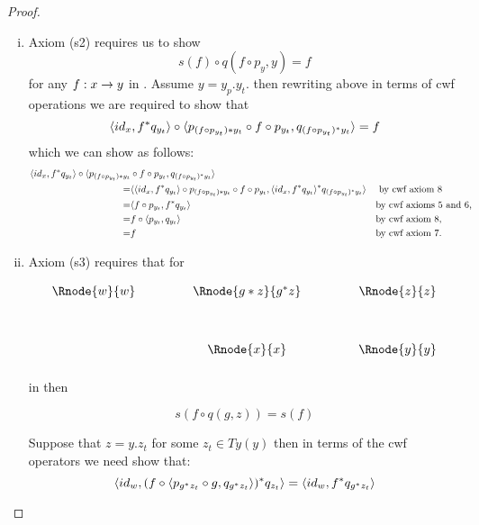 \begin{proof}
\begin{enumerate}[(i)]
\item Axiom (s2) requires us to show 
\begin{equation}
s(f) \circ q( f \circ p_y     ,y)=f
\end{equation}
for any $f:x \rightarrow y$  in \catc.
Assume 
 $y=y_p.y_t$.
then rewriting above in terms of cwf operations we are required to show that 
\begin{equation}
\langle id_x,f^*q_{y_t}\rangle\circ \langle p_{(f \circ p_{y_t})*y_t}\circ f \circ p_{y_t},
                                    q_{(f \circ p_{y_t})^*y_t}
																		\rangle = f
\end{equation}
which we can show as follows:
\begin{align*}
\langle id_x,f^*q_{y_t}\rangle\circ \langle p_{(f \circ p_{y_t})*y_t}&\circ f \circ p_{y_t}, q_{(f \circ p_{y_t})^*y_t}\rangle \\
=& \langle\langle id_x,f^*q_{y_t}\rangle \circ p_{(f \circ p_{y_t})*y_t}\circ f \circ p_{y_t}, 
				  \langle id_x,f^*q_{y_t}\rangle ^* q_{(f \circ p_{y_t})^*y_t}
         \rangle && \mbox{ by cwf axiom 8} \\
=& \langle f \circ p_{y_t},f^*q_{y_t}\rangle && \mbox{by cwf axioms 5 and 6,} \\
=& f \circ \langle p_{y_t},q_{y_t}\rangle    && \mbox{by cwf axiom 8,} \\
=& f                                  && \mbox{by cwf axiom 7.}
\end{align*}
\item 
Axiom (s3) requires that for

\begin{center}
\begin{displaymath}
\begin{array}{c p{.9cm} c p{.9cm} c}
\Rnode{w}{w}&& \Rnode{g*z}{g \sub z} && \Rnode{z}{z} \\ [1.2cm]
            && \Rnode{x}{x}  && \Rnode{y}{y} \\ [0.2cm]
\end{array}
\end{displaymath}
\end{center}

\noindent in  then

\begin{equation}
s(f \circ q(g,z))=s(f)
\end{equation}

Suppose that $z=y.z_t$ for some $z_t \in Ty(y)$ then in terms of the cwf operators we need show that:
\begin{equation}
\langle id_w,(f \circ \langle p_{g^*z_t} \circ g, q_{g^*z_t}\rangle )^* q_{z_t}\rangle = \langle id_w,f^*q_{g^*z_t}\rangle
\end{equation}


\end{enumerate}
\end{proof}
